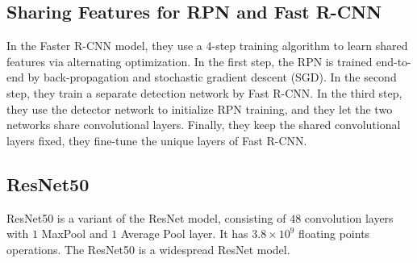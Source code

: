 \subsection{Sharing Features for RPN and Fast R-CNN}
In the Faster R-CNN model, they use a 4-step training algorithm to learn shared features via alternating optimization. In the first step, the RPN is trained end-to-end by back-propagation and stochastic gradient descent (SGD). In the second step, they train a separate detection network by Fast R-CNN. In the third step, they use the detector network to initialize RPN training, and they let the two networks share convolutional layers. Finally, they keep the shared convolutional layers fixed, they fine-tune the unique layers of Fast R-CNN.

\subsection{ResNet50}
ResNet50 is a variant of the ResNet model, consisting of $48$ convolution layers with $1$ MaxPool and $1$ Average Pool layer. It has $3.8 \times 10^9$ floating points operations. The ResNet50 is a widespread ResNet model. \\
